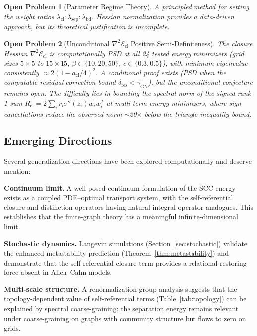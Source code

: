 \documentclass[lettersize,journal]{IEEEtran}
\newtheorem{openproblem}{Open Problem}
\begin{document}
\begin{openproblem}[Parameter Regime Theory]
A principled method for setting the weight ratios $\lambda_{\mathrm{cl}} : \lambda_{\mathrm{sep}} : \lambda_{\mathrm{bd}}$. Hessian normalization provides a data-driven approach, but its theoretical justification is incomplete.
\end{openproblem}

\begin{openproblem}[Unconditional $\nabla^2\mathcal{E}_{\mathrm{cl}}$ Positive Semi-Definiteness]
The closure Hessian $\nabla^2\mathcal{E}_{\mathrm{cl}}$ is computationally PSD at all 24 tested energy minimizers (grid sizes $5 \times 5$ to $15 \times 15$, $\beta \in \{10, 20, 50\}$, $c \in \{0.3, 0.5\}$), with minimum eigenvalue consistently $\approx 2(1 - a_{\mathrm{cl}}/4)^2$. A conditional proof exists (PSD when the computable residual correction bound $\delta_{\mathrm{res}} < \gamma_{\mathrm{GN}}$), but the unconditional conjecture remains open. The difficulty lies in bounding the spectral norm of the signed rank-1 sum $R_{\mathrm{cl}} = 2\sum_i r_i \sigma''(z_i) w_i w_i^T$ at multi-term energy minimizers, where sign cancellations reduce the observed norm $\sim$20$\times$ below the triangle-inequality bound.
\end{openproblem}

\subsection{Emerging Directions}

Several generalization directions have been explored computationally and deserve mention:

\textbf{Continuum limit.} A well-posed continuum formulation of the SCC energy exists as a coupled PDE--optimal transport system, with the self-referential closure and distinction operators having natural integral-operator analogues. This establishes that the finite-graph theory has a meaningful infinite-dimensional limit.

\textbf{Stochastic dynamics.} Langevin simulations (Section~\ref{sec:stochastic}) validate the enhanced metastability prediction (Theorem~\ref{thm:metastability}) and demonstrate that the self-referential closure term provides a relational restoring force absent in Allen--Cahn models.

\textbf{Multi-scale structure.} A renormalization group analysis suggests that the topology-dependent value of self-referential terms (Table~\ref{tab:topology}) can be explained by spectral coarse-graining: the separation energy remains relevant under coarse-graining on graphs with community structure but flows to zero on grids.
\end{document}
